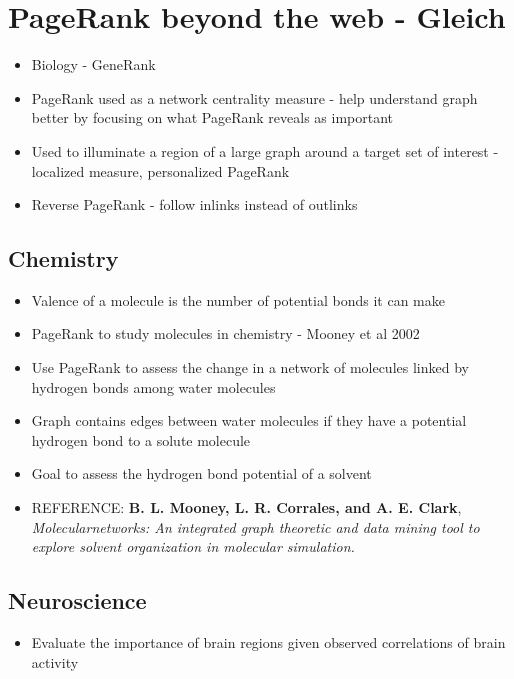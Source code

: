 \documentclass[11pt]{report}
\begin{document}
\chapter{PageRank beyond the web - Gleich}
\begin{itemize}
\item Biology - GeneRank
\item PageRank used as a network centrality measure - help understand graph better by focusing on what PageRank reveals as important
\item Used to illuminate a region of a large graph around a target set of interest - localized measure, personalized PageRank
\item Reverse PageRank - follow inlinks instead of outlinks
\end{itemize}
\section{Chemistry}
\begin{itemize}
\item Valence of a molecule is the number of potential bonds it can make
\item PageRank to study molecules in chemistry - Mooney et al 2002
\item Use PageRank to assess the change in a network of molecules linked by hydrogen bonds among water molecules
\item Graph contains edges between water molecules if they have a potential hydrogen bond to a solute molecule
\item Goal to assess the hydrogen bond potential of a solvent
\item REFERENCE: \textbf{B. L. Mooney, L. R. Corrales, and A. E. Clark}, \textit{Molecularnetworks: An integrated graph
theoretic and data mining tool to explore solvent organization in molecular simulation.}
\end{itemize}
\section{Neuroscience}
\begin{itemize}
\item Evaluate the importance of brain regions given observed correlations of brain activity
\end{itemize}
\end{document}
